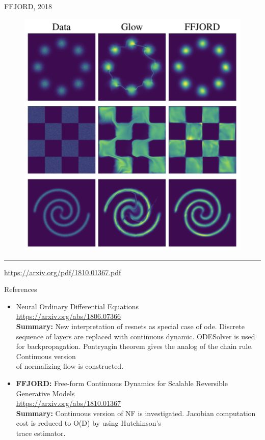 \documentclass{beamer}
\begin{document}
\begin{frame}{FFJORD, 2018}
\begin{figure}
    \centering
    \includegraphics[width=0.6\linewidth]{figs/ffjord.png}
\end{figure}
\vfill
\hrule\medskip
{\scriptsize \href{https://arxiv.org/pdf/1810.01367.pdf}{https://arxiv.org/pdf/1810.01367.pdf}} 
\end{frame}
\begin{frame}{References}
{\tiny
\begin{itemize}
    \item Neural Ordinary Differential Equations \\
    \href{https://arxiv.org/abs/1806.07366}{https://arxiv.org/abs/1806.07366} \\
    \textbf{Summary:} New interpretation of resnets as special case of ode. 
    Discrete sequence of layers  are replaced with continuous dynamic. ODESolver is used for backpropagation. Pontryagin theorem gives the analog of the chain rule. Continuous version \\ of normalizing flow is constructed.
    
    \item \textbf{FFJORD:} Free-form Continuous Dynamics for Scalable Reversible Generative Models \\
    \href{https://arxiv.org/abs/1810.01367}{https://arxiv.org/abs/1810.01367} \\
    \textbf{Summary:} Continuous version of NF is investigated. 
    Jacobian computation cost is reduced to O(D) by using Hutchinson’s \\ trace estimator. 
\end{itemize}
}
\end{frame}
\end{document}
